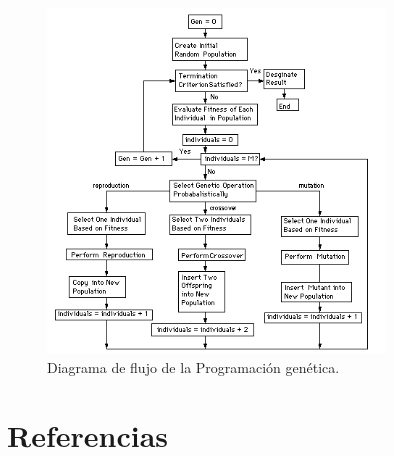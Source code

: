 \documentclass[12pt]{article} \usepackage[utf8x]{inputenc}
\begin{document}
\begin{figure}[H]
    \centering
    \includegraphics[width=0.8\textwidth]{FlowchartGP.PNG}
    \caption{Diagrama de flujo de la Programación genética.}
    \label{fig:dfd:1}
\end{figure}


\section{Referencias}
\end{document}
